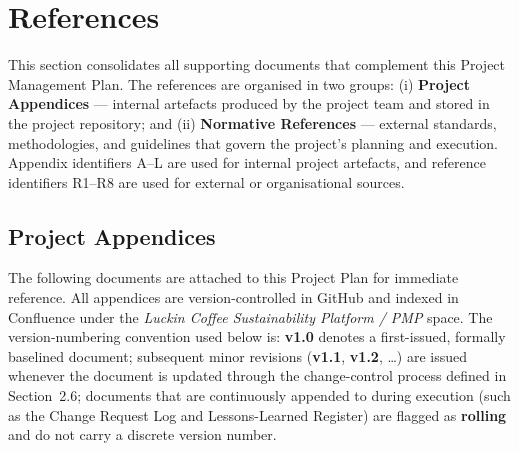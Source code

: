 \documentclass[12pt,a4paper]{article}
\begin{document}
\section{References}

This section consolidates all supporting documents that complement this Project Management Plan. The references are organised in two groups: (i) \textbf{Project Appendices} --- internal artefacts produced by the project team and stored in the project repository; and (ii) \textbf{Normative References} --- external standards, methodologies, and guidelines that govern the project's planning and execution. Appendix identifiers A--L are used for internal project artefacts, and reference identifiers R1--R8 are used for external or organisational sources.

\subsection{Project Appendices}

The following documents are attached to this Project Plan for immediate reference. All appendices are version-controlled in GitHub and indexed in Confluence under the \textit{Luckin Coffee Sustainability Platform / PMP} space. The version-numbering convention used below is: \textbf{v1.0} denotes a first-issued, formally baselined document; subsequent minor revisions (\textbf{v1.1}, \textbf{v1.2}, \dots) are issued whenever the document is updated through the change-control process defined in Section~2.6; documents that are continuously appended to during execution (such as the Change Request Log and Lessons-Learned Register) are flagged as \textbf{rolling} and do not carry a discrete version number.
\end{document}
